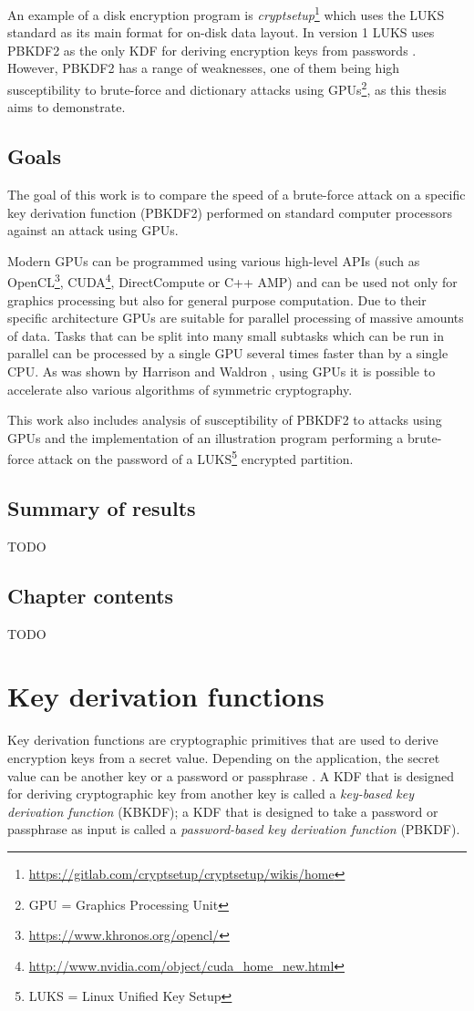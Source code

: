 \documentclass[12pt,oneside]{fithesis2}
\begin{document}
      An example of a disk encryption program is \emph{cryptsetup}\footnote{\url{https://gitlab.com/cryptsetup/cryptsetup/wikis/home}} which uses the LUKS standard as its main format for on-disk data layout. In version 1 LUKS uses PBKDF2 as the only KDF for deriving encryption keys from passwords \cite{luks}. However, PBKDF2 has a range of weaknesses, one of them being high susceptibility to brute-force and dictionary attacks using GPUs\footnote{GPU = Graphics Processing Unit}, as this thesis aims to demonstrate.
    
      \section{Goals}
      The goal of this work is to compare the speed of a brute-force attack on a specific key derivation function (PBKDF2) performed on standard computer processors against an attack using GPUs.
      
      Modern GPUs can be programmed using various high-level APIs (such as OpenCL\footnote{\url{https://www.khronos.org/opencl/}}, CUDA\footnote{\url{http://www.nvidia.com/object/cuda_home_new.html}}, DirectCompute or C++ AMP) and can be used not only for graphics processing but also for general purpose computation. Due to their specific architecture GPUs are suitable for parallel processing of massive amounts of data. Tasks that can be split into many small subtasks which can be run in parallel can be processed by a single GPU several times faster than by a single CPU. As was shown by Harrison and Waldron \cite{Harrison}, using GPUs it is possible to accelerate also various algorithms of symmetric cryptography.
    
      This work also includes analysis of susceptibility of PBKDF2 to attacks using GPUs and the implementation of an illustration program performing a brute-force attack on the password of a LUKS\footnote{LUKS = Linux Unified Key Setup} encrypted partition.
    
      \section{Summary of results}
      TODO
      
      \section{Chapter contents}
      TODO
    
    \chapter{Key derivation functions}
      Key derivation functions are cryptographic primitives that are used to derive encryption keys from a secret value. Depending on the application, the secret value can be another key or a password or passphrase \cite{wiki:KDF}. A KDF that is designed for deriving cryptographic key from another key is called a \emph{key-based key derivation function} (KBKDF); a KDF that is designed to take a password or passphrase as input is called a \emph{password-based key derivation function} (PBKDF).
      
\end{document}
